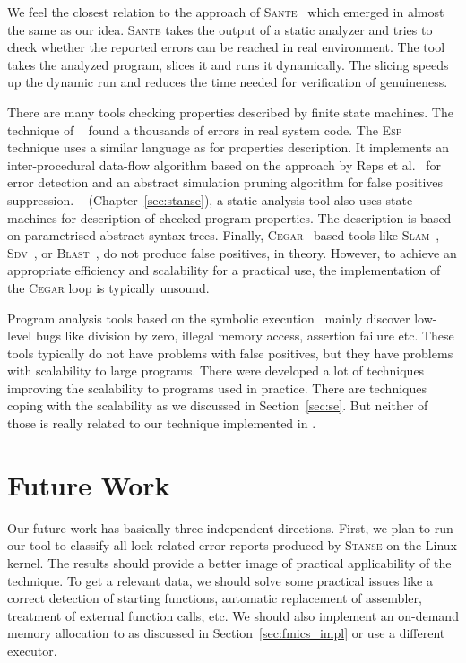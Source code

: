 We feel the closest relation to the approach of
\textsc{Sante}~\cite{slic_sante} which emerged in almost the same as our idea.
\textsc{Sante} takes the output of a static analyzer and tries to check
whether the reported errors can be reached in real environment. The tool takes
the analyzed program, slices it and runs it dynamically. The slicing speeds up
the dynamic run and reduces the time needed for verification of genuineness.

There are many tools checking properties described by finite state machines.
The technique of \xgcc~\cite{metacomp} found a thousands of errors in real
system code.  The \textsc{Esp}~\cite{esp} technique uses a similar language as
\xgcc for properties description.  It implements an inter-procedural data-flow
algorithm based on the approach by Reps et al.~\cite{dataflow_large} for error
detection and an abstract simulation pruning algorithm for false positives
suppression.  \stan~\cite{stanse} (Chapter~\ref{sec:stanse}), a static
analysis tool also uses state machines for description of checked program
properties. The description is based on parametrised abstract syntax trees.
Finally, \textsc{Cegar}~\cite{cegar} based tools like
\textsc{Slam}~\cite{slam_decade, slam2}, \textsc{Sdv}~\cite{sdv}, or
\textsc{Blast}~\cite{blast}, do not produce false positives, in theory.
However, to achieve an appropriate efficiency and scalability for a practical
use, the implementation of the \textsc{Cegar} loop is typically unsound.

Program analysis tools based on the symbolic execution~\cite{se_king} mainly
discover low-level bugs like division by zero, illegal memory access,
assertion failure etc. These tools typically do not have problems with false
positives, but they have problems with scalability to large programs. There
were developed a lot of techniques improving the scalability to programs used
in practice. There are techniques coping with the scalability as we discussed
in Section~\ref{sec:se}. But neither of those is really related to our
technique implemented in \symbio.


\section{Future Work}\label{sec:fmics_future}
Our future work has basically three independent directions.  First, we plan to
run our tool to classify all lock-related error reports produced by
\textsc{Stanse} on the Linux kernel. The results should provide a better image
of practical applicability of the technique. To get a relevant data, we should
solve some practical issues like a correct detection of starting functions,
automatic replacement of assembler, treatment of external function calls, etc.
We should also implement an on-demand memory allocation to \klee as discussed
in Section~\ref{sec:fmics_impl} or use a different executor.

